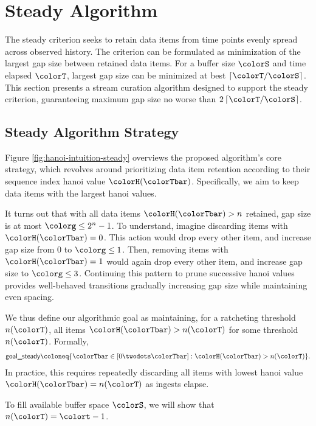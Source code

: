 \section{Steady Algorithm} \label{sec:steady}

The steady criterion seeks to retain data items from time points evenly spread across observed history.
The criterion can be formulated as minimization of the largest gap size between retained data items.
For a buffer size $\colorS$ and time elapsed $\colorT$, largest gap size can be minimized at best $\left\lceil \colorT / \colorS \right\rceil$.
This section presents a stream curation algorithm designed to support the steady criterion, guaranteeing maximum gap size no worse than $2\left\lceil \colorT / \colorS \right\rceil$.

\subsection{Steady Algorithm Strategy}
\label{sec:steady-strategy}

Figure \ref{fig:hanoi-intuition-steady} overviews the proposed algorithm's core strategy, which revolves around prioritizing data item retention according to their sequence index hanoi value $\colorH(\colorTbar)$.
Specifically, we aim to keep data items with the largest hanoi values.

It turns out that with all data items $\colorH(\colorTbar) > n$ retained, gap size is at most $\colorg \leq 2^n - 1$.
To understand, imagine discarding items with $\colorH(\colorTbar) = 0$.
This action would drop every other item, and increase gap size from 0 to $\colorg \leq 1$.
Then, removing items with $\colorH(\colorTbar) = 1$ would again drop every other item, and increase gap size to $\colorg \leq 3$.
Continuing this pattern to prune successive hanoi values provides well-behaved transitions gradually increasing gap size while maintaining even spacing.

We thus define our algorithmic goal as maintaining, for a ratcheting threshold $n(\colorT)$, all items $\colorH(\colorTbar) > n(\colorT)$ for some threshold $n(\colorT)$.
Formally,
\begin{align*}
\textsf{goal\_steady}
\coloneq \{
\colorTbar \in [0 \twodots \colorTbar]
: \colorH(\colorTbar) > n(\colorT)
\}.
\end{align*}
In practice, this requires repeatedly discarding all items with lowest hanoi value $\colorH(\colorTbar) = n(\colorT)$ as ingests elapse.

To fill available buffer space $\colorS$, we will show that $n(\colorT) = \colort - 1$.

